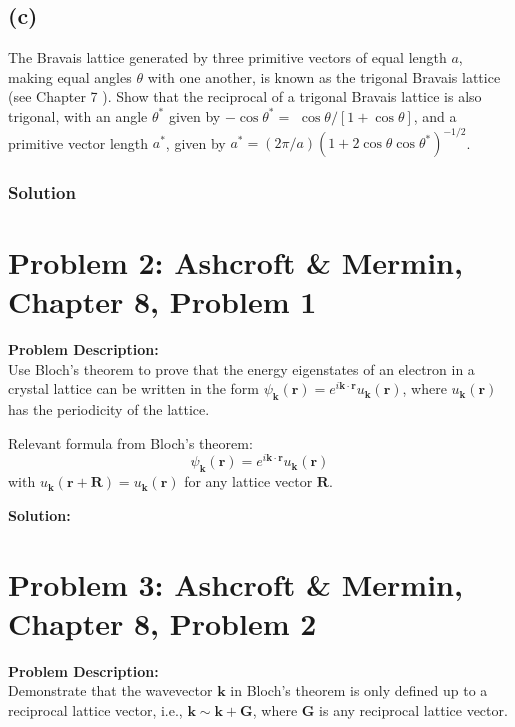 \documentclass[12pt]{article}
\begin{document}
\subsection{(c)}
 The Bravais lattice generated by three primitive vectors of equal length $a$, making equal angles $\theta$ with one another, is known as the trigonal Bravais lattice (see Chapter 7 ). Show that the reciprocal of a trigonal Bravais lattice is also trigonal, with an angle $\theta^*$ given by $-\cos \theta^*=$ $\cos \theta /[1+\cos \theta]$, and a primitive vector length $a^*$, given by $a^*=(2 \pi / a)\left(1+2 \cos \theta \cos \theta^*\right)^{-1 / 2}$.
\subsubsection{Solution}


\section*{Problem 2: Ashcroft \& Mermin, Chapter 8, Problem 1}
\noindent \textbf{Problem Description:} \\
Use Bloch's theorem to prove that the energy eigenstates of an electron in a crystal lattice can be written in the form \( \psi_{\mathbf{k}}(\mathbf{r}) = e^{i \mathbf{k} \cdot \mathbf{r}} u_{\mathbf{k}}(\mathbf{r}) \), where \( u_{\mathbf{k}}(\mathbf{r}) \) has the periodicity of the lattice.

Relevant formula from Bloch's theorem:
\begin{equation}
\psi_{\mathbf{k}}(\mathbf{r}) = e^{i \mathbf{k} \cdot \mathbf{r}} u_{\mathbf{k}}(\mathbf{r})
\end{equation}
with \( u_{\mathbf{k}}(\mathbf{r} + \mathbf{R}) = u_{\mathbf{k}}(\mathbf{r}) \) for any lattice vector \( \mathbf{R} \).

\vspace{2em}
\noindent \textbf{Solution:} \\
\vspace{10em}

\section*{Problem 3: Ashcroft \& Mermin, Chapter 8, Problem 2}
\noindent \textbf{Problem Description:} \\
Demonstrate that the wavevector \( \mathbf{k} \) in Bloch's theorem is only defined up to a reciprocal lattice vector, i.e., \( \mathbf{k} \sim \mathbf{k} + \mathbf{G} \), where \( \mathbf{G} \) is any reciprocal lattice vector.
\end{document}
